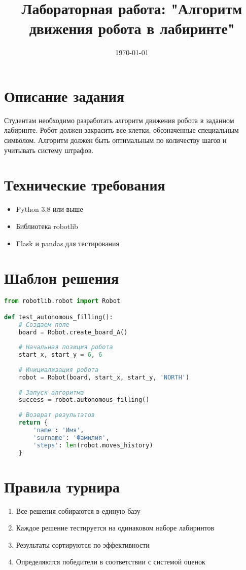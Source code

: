 \documentclass{article}
\title{Лабораторная работа: "Алгоритм движения робота в лабиринте"}
\date{\today}
\begin{document}
\maketitle

\section{Описание задания}
Студентам необходимо разработать алгоритм движения робота в заданном лабиринте. Робот должен закрасить все клетки, обозначенные специальным символом. Алгоритм должен быть оптимальным по количеству шагов и учитывать систему штрафов.

\section{Технические требования}
\begin{itemize}
    \item Python 3.8 или выше
    \item Библиотека robotlib
    \item Flask и pandas для тестирования
\end{itemize}

\section{Шаблон решения}
\begin{lstlisting}[language=Python]
from robotlib.robot import Robot

def test_autonomous_filling():
    # Создаем поле
    board = Robot.create_board_A()
    
    # Начальная позиция робота
    start_x, start_y = 6, 6
    
    # Инициализация робота
    robot = Robot(board, start_x, start_y, 'NORTH')
    
    # Запуск алгоритма
    success = robot.autonomous_filling()
    
    # Возврат результатов
    return {
        'name': 'Имя',
        'surname': 'Фамилия',
        'steps': len(robot.moves_history)
    }
\end{lstlisting}

\section{Правила турнира}
\begin{enumerate}
    \item Все решения собираются в единую базу
    \item Каждое решение тестируется на одинаковом наборе лабиринтов
    \item Результаты сортируются по эффективности
    \item Определяются победители в соответствии с системой оценок
\end{enumerate}
\end{document}
